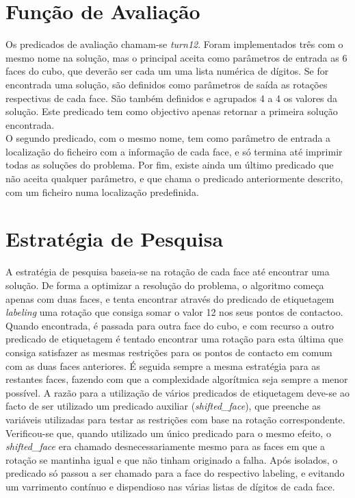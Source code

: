 
\section{Função de Avaliação}
\label{restr:3}

Os predicados de avaliação chamam-se \textit{turn12}. Foram implementados três com o mesmo nome na solução, mas o principal aceita como parâmetros de entrada as 6 faces do cubo, que deverão ser cada um uma lista numérica de dígitos. Se for encontrada uma solução, são definidos como parâmetros de saída as rotações respectivas de cada face. São também definidos e agrupados 4 a 4 os valores da solução. Este predicado tem como objectivo apenas retornar a primeira solução encontrada.\\
O segundo predicado, com o mesmo nome, tem como parâmetro de entrada a localização do ficheiro com a informação de cada face, e só termina até imprimir todas as soluções do problema.
Por fim, existe ainda um último predicado que não aceita qualquer parâmetro, e que chama o predicado anteriormente descrito, com um ficheiro numa localização predefinida.





\section{Estratégia de Pesquisa}
\label{rest:4}

A estratégia de pesquisa baseia-se na rotação de cada face até encontrar uma solução.
De forma a optimizar a resolução do problema, o algoritmo começa apenas com duas faces, e tenta encontrar através do predicado de etiquetagem \textit{labeling} uma rotação que consiga somar o valor 12 nos seus pontos de contactoo.
Quando encontrada, é passada para outra face do cubo, e com recurso a outro predicado de etiquetagem é tentado encontrar uma rotação para esta última que consiga satisfazer as mesmas restrições para os pontos de contacto em comum com as duas faces anteriores. É seguida sempre a mesma estratégia para as restantes faces, fazendo com que a complexidade algorítmica seja sempre a menor possível.
A razão para a utilização de vários predicados de etiquetagem deve-se ao facto de ser utilizado um predicado auxiliar (\textit{shifted\_face}), que preenche as variáveis utilizadas para testar as restrições com base na rotação correspondente. 
Verificou-se que, quando utilizado um único predicado para o mesmo efeito, o \textit{shifted\_face} era chamado desnecessariamente mesmo para as faces em que a rotação se mantinha igual e que não tinham originado a falha.
Após isolados, o predicado só passou a ser chamado para a face do respectivo labeling, e evitando um varrimento contínuo e dispendioso nas várias listas de dígitos de cada face.




